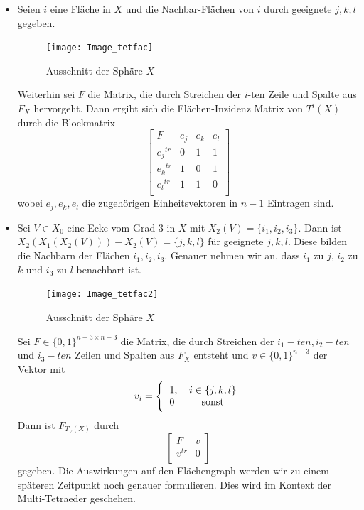 \documentclass[12pt,titlepage,twoside,cleardoublepage]{article}
\theoremstyle{nummermitklammern}
\numberwithin{equation}{section}
\begin{document}
\begin{enumerate}
\begin{itemize}  
\item Seien $i$ eine Fläche in $X$ und die Nachbar-Flächen von $i$ durch geeignete $j,k,l$ gegeben.
\begin{figure}[H]
\begin{center}
\texttt{[image: Image\_tetfac]}
\end{center}
\caption{Ausschnitt der Sphäre $X$}
\end{figure}
Weiterhin sei $F$ die Matrix, die durch Streichen der $i$-ten Zeile und Spalte aus $F_X$ hervorgeht. Dann ergibt sich die Flächen-Inzidenz Matrix von $T^i(X)$ durch die Blockmatrix
\[
\left[ 
\begin{array}{c|ccc} 
  F & e_j& e_k &e_l \\ 
  \hline 
  {e_j}^{tr} & 0 & 1 & 1  \\
  {e_k}^{tr} & 1 & 0 & 1 \\
  {e_l}^{tr} & 1 & 1 & 0 \\
\end{array} 
\right]
\]
wobei $e_j,e_k,e_l$ die zugehörigen Einheitsvektoren in $n-1$ Eintragen sind. 
\item Sei $V\in X_0$ eine Ecke vom Grad 3 in $X$ mit $X_2(V)=\{i_1,i_2,i_3\}.$ Dann ist $X_2(X_1(X_2(V)))-X_2(V)=\{j,k,l\}$ für geeignete $j,k,l$. Diese bilden die Nachbarn der Flächen $i_1,i_2,i_3.$ Genauer nehmen wir an, dass $i_1$ zu $j$, $i_2$ zu $k$ und $i_3$ zu $l$ benachbart ist.
\begin{figure}[H]
\begin{center}
\texttt{[image: Image\_tetfac2]}
\end{center}
\caption{Ausschnitt der Sphäre $X$}
\end{figure}  
Sei $F\in \{0,1\}^{n-3\times n-3}$ die Matrix, die durch Streichen der $i_1-ten,i_2-ten$ und $i_3-ten$ Zeilen und Spalten  aus $F_X$ entsteht und $v\in \{0,1\}^{n-3}$ der Vektor mit
\[
v_{i}=
\Biggl{\{\begin{tabular}[l]{lcr}
1,&\textcolor{black}{$i\in \{j,k,l\}$} \\
0& sonst\\
\end{tabular}}
\] Dann ist $F_{T_V(X)}$ durch 
\[
\left[ 
\begin{array}{c|ccc} 
  F & v \\ 
  \hline 
  {v}^{tr} & 0\\
\end{array} 
\right]
\]
gegeben.
Die Auswirkungen auf den Flächengraph werden wir zu einem späteren Zeitpunkt noch genauer formulieren. Dies wird im Kontext der Multi-Tetraeder geschehen.
\end{itemize}
\end{enumerate}
\end{document}
